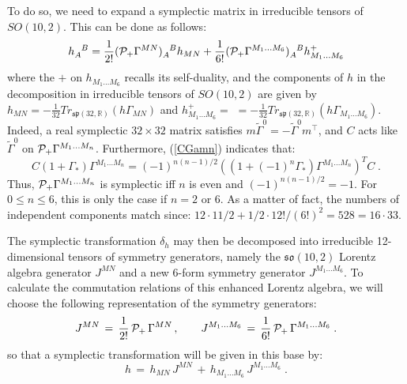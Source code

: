 \documentclass[a4paper,11pt]{article}
\begin{document}
To do so, we need to expand a symplectic matrix in irreducible tensors 
of $SO(10,2)$. This can be done as follows:
\begin{equation}\label{h12}
h_A^{\phantom{A}B} = 
\frac{1}{2!} ({\cal P}_+ \Gamma^{MN})_A^{\phantom{A}B} h_{MN} + 
\frac{1}{6!} ({\cal P}_+ \Gamma^{M_1 \ldots M_6})_A^{\phantom{A}B} h^+_{M_1 \ldots M_6}
\end{equation}
where the $+$ on $h_{M_1 \ldots M_6}$ recalls its self-duality, and the components of $h$ in 
the decomposition in irreducible tensors of $SO(10,2)$ are given by  
$h_{MN} = -\frac{1}{32} Tr_{\mathfrak{sp}(32,\mathbb{R})}(h \Gamma_{MN})$ and 
$h^+_{M_1 \ldots M_6} = $ 
\linebreak $=-\frac{1}{32} Tr_{\mathfrak{sp}(32,\mathbb{R})}(h \Gamma_{M_1 \ldots M_6})$.
Indeed, a real symplectic $32 \times 32$ matrix satisfies $m \tilde{\Gamma}^0 = -\tilde{\Gamma}^0 m^{\top}$,
and $C$ acts like $\tilde{\Gamma}^0$ on ${\cal P}_{+} \Gamma^{M_1 \ldots M_n}$. Furthermore, (\ref{CGamn})
indicates that: 
\begin{equation}
C (1 + \Gamma_{*}) \Gamma^{M_1 \ldots M_n} = (-1)^{n(n-1)/2} ((1 + (-1)^n \Gamma_{*}) \Gamma^{M_1 \ldots M_n})^T C \;.
\end{equation} 
Thus, ${\cal P}_{+} \Gamma^{M_1 \ldots M_n}$ is symplectic iff $n$ is even and $(-1)^{n(n-1)/2}=-1$.
For $0 \leq n \leq 6$, this is only the case if $n=2$ or 6. As a matter of fact, the numbers of independent components
match since: $12\cdot 11/2 + 1/2 \cdot 12!/(6!)^2 =528 = 16 \cdot 33$.

The symplectic transformation $\delta_{h}$ may then be decomposed
into irreducible 12-dimensional tensors of symmetry generators, namely the $\mathfrak{so}(10,2)$  
Lorentz algebra generator $J^{MN}$  and a new 6-form symmetry generator $J^{M_1 \ldots M_6}$. 
To calculate the commutation relations of this enhanced Lorentz
algebra, we will choose the following representation of the symmetry generators:
$$
J^{MN} \,=\, \frac{1}{2!}\,{\cal P_+}\,\Gamma^{MN}\,,
\qquad J^{M_1 \ldots M_6} \,=\, \frac{1}{6!}\,{\cal P_+}\,\Gamma^{M_1 \ldots M_6}\;.
$$
so that a symplectic transformation will be given in this base by:
$$
h\,=\,h_{MN}\,J^{MN}\,+\,h_{M_1 \ldots M_6}\,J^{M_1 \ldots M_6}\;.
$$
\end{document}

